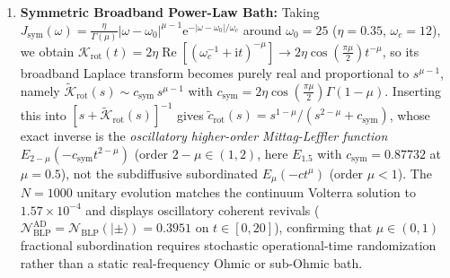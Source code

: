 \documentclass[twocolumn,10pt,amsmath,amssymb,floatfix]{revtex4-2}
\theoremstyle{plain}
\theoremstyle{definition}
\newcommand{\ii}{\mathrm{i}}
\newcommand{\ee}{\mathrm{e}}
\newcommand{\NBLP}{\mathcal{N}_{\mathrm{BLP}}}
\begin{document}
\begin{enumerate}[leftmargin=1.4em,itemsep=2pt]
\item \textbf{Symmetric Broadband Power-Law Bath:} Taking $J_{\mathrm{sym}}(\omega) = \frac{\eta}{\Gamma(\mu)}|\omega-\omega_0|^{\mu-1}\ee^{-|\omega-\omega_0|/\omega_c}$ around $\omega_0=25$ ($\eta=0.35$, $\omega_c=12$), we obtain $\mathcal{K}_{\mathrm{rot}}(t) = 2\eta\operatorname{Re}[(\omega_c^{-1}+\ii t)^{-\mu}] \to 2\eta\cos(\frac{\pi\mu}{2})t^{-\mu}$, so its broadband Laplace transform becomes purely real and proportional to $s^{\mu-1}$, namely $\tilde{\mathcal{K}}_{\mathrm{rot}}(s) \sim c_{\mathrm{sym}}\,s^{\mu-1}$ with $c_{\mathrm{sym}} = 2\eta\cos(\frac{\pi\mu}{2})\Gamma(1-\mu)$. Inserting this into $[s + \tilde{\mathcal{K}}_{\mathrm{rot}}(s)]^{-1}$ gives $\tilde{c}_{\mathrm{rot}}(s) = s^{1-\mu}/(s^{2-\mu} + c_{\mathrm{sym}})$, whose exact inverse is the \emph{oscillatory higher-order Mittag-Leffler function} $E_{2-\mu}(-c_{\mathrm{sym}} t^{2-\mu})$ (order $2-\mu \in (1,2)$, here $E_{1.5}$ with $c_{\mathrm{sym}} = 0.87732$ at $\mu=0.5$), not the subdiffusive subordinated $E_\mu(-c t^\mu)$ (order $\mu < 1$). The $N=1000$ unitary evolution matches the continuum Volterra solution to $1.57 \times 10^{-4}$ and displays oscillatory coherent revivals ($\NBLP^{\mathrm{AD}} = \NBLP(|\pm\rangle) = 0.3951$ on $t \in [0, 20]$), confirming that $\mu \in (0,1)$ fractional subordination requires stochastic operational-time randomization rather than a static real-frequency Ohmic or sub-Ohmic bath.
\end{enumerate}
\end{document}
